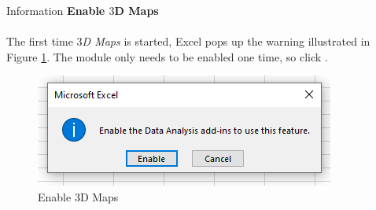 \begin{center}
	\begin{infobox}{Information}
		\textbf{Enable $ 3 $D Maps}
		\\
		\\
		The first time \textit{$ 3 $D Maps} is started, Excel pops up the warning illustrated in Figure \ref{08:fig20}. The module only needs to be enabled one time, so click .

		\begin{figure}[H]
			\centering
			\includegraphics[width=\maxwidth{.85\linewidth}]{gfx/ch08_fig20}
			\caption{Enable $ 3 $D Maps}
			\label{08:fig20}
		\end{figure}

	\end{infobox}
\end{center}


